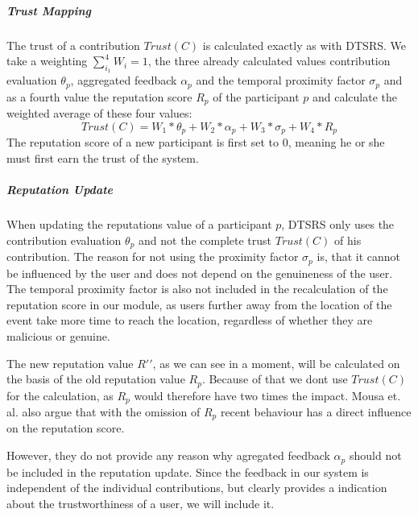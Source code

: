 \documentclass[
a4paper,     %
titlepage,   %
14pt         %
]{scrartcl}  %
\theoremstyle{mystyle}
\begin{document}
\subparagraph{Trust Mapping} The trust of a contribution $Trust(C)$ is calculated exactly as with DTSRS. We take a weighting $\sum_{i_1}^{4} W_i = 1$, the three already calculated values contribution evaluation $\theta_p$, aggregated feedback $\alpha_p$ and the temporal proximity factor $\sigma_p$ and as a fourth value the reputation score $R_p$ of the participant $p$ and calculate the weighted average of these four values:
\begin{equation}
  Trust(C) = W_1 * \theta_p +W_2 *  \alpha_p +W_3 *  \sigma_p +W_4 *  R_p
\end{equation}
The reputation score of a new participant is first set to 0, meaning he or she must first earn the trust of the system.

\subparagraph{Reputation Update} When updating the reputations value of a participant $p$, DTSRS only uses the contribution evaluation $\theta_p$ and not the complete trust $Trust(C)$ of his contribution. The reason for not using the proximity factor $\sigma_p$ is, that it cannot be influenced by the user and does not depend on the genuineness of the user. The temporal proximity factor is also not included in the recalculation of the reputation score in our module, as users further away from the location of the event take more time to reach the location, regardless of whether they are malicious or genuine.

The new reputation value $R\prime\prime$, as we can see in a moment, will be calculated on the basis of the old reputation value $R_p$. Because of that we dont use $Trust(C)$ for the calculation, as $R_p$ would therefore have two times the impact. Mousa et. al. also argue that with the omission of $R_p$ recent behaviour has a direct influence on the reputation score.

However, they do not provide any reason why agregated feedback $\alpha_p$ should not be included in the reputation update. Since the feedback in our system is independent of the individual contributions, but clearly provides a indication about the trustworthiness of a user, we will include it.\\
\end{document}
